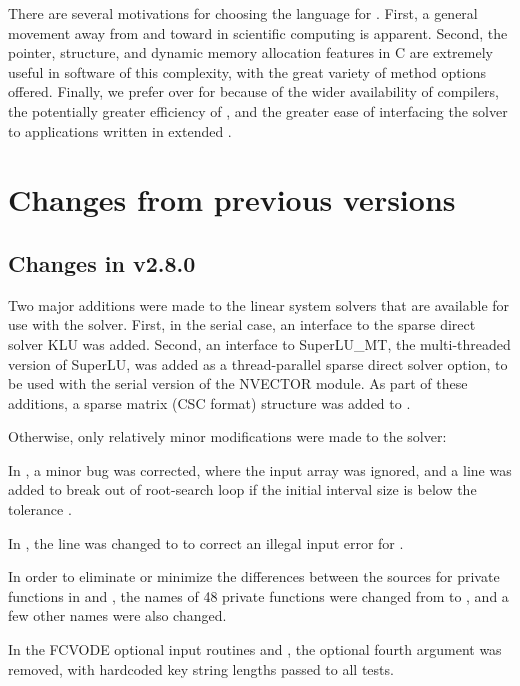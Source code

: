 There are several motivations for choosing the {\C} language for {\cvode}.
First, a general movement away from {\F} and toward {\C} in scientific
computing is apparent.  Second, the pointer, structure, and dynamic
memory allocation features in C are extremely useful in software of
this complexity, with the great variety of method options offered.
Finally, we prefer {\C} over {\CPP} for {\cvode} because of the wider
availability of {\C} compilers, the potentially greater efficiency of {\C},
and the greater ease of interfacing the solver to applications written
in extended {\F}.

\section{Changes from previous versions}

\subsection*{Changes in v2.8.0}

Two major additions were made to the linear system solvers that are
available for use with the {\cvode} solver.  First, in the serial case,
an interface to the sparse direct solver KLU was added.
Second, an interface to SuperLU\_MT, the multi-threaded version of
SuperLU, was added as a thread-parallel sparse direct solver option,
to be used with the serial version of the NVECTOR module.
As part of these additions, a sparse matrix (CSC format) structure 
was added to {\cvode}.

Otherwise, only relatively minor modifications were made to the
{\cvode} solver:

In , a minor bug was corrected, where the input
array  was ignored, and a line was added to break out of
root-search loop if the initial interval size is below the tolerance
.

In , the line  was changed to
 to correct an illegal input error for .

In order to eliminate or minimize the differences between the sources
for private functions in {\cvode} and {\cvodes}, the names of 48
private functions were changed from  to , and a few
other names were also changed.

In the FCVODE optional input routines  and ,
the optional fourth argument  was removed, with
hardcoded key string lengths passed to all  tests.

